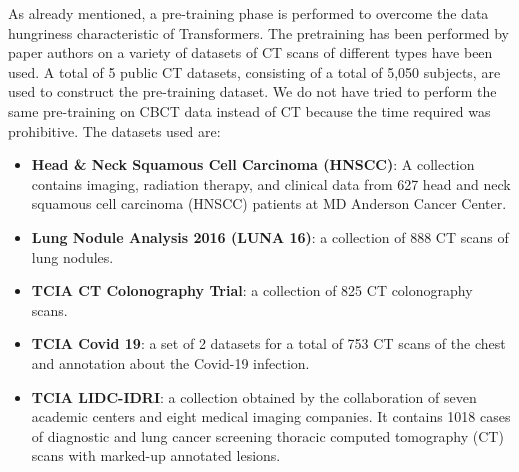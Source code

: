 As already mentioned, a pre-training phase is performed to overcome the data
hungriness characteristic of Transformers. The pretraining has been performed by
paper authors on a variety of datasets of CT scans of different types have been
used. A total of 5 public CT datasets, consisting of a total of 5,050 subjects,
are used to construct the pre-training dataset. We do not have tried to perform
the same pre-training on CBCT data instead of CT because the time required was
prohibitive.
The datasets used are:
\begin{itemize}
  \item{\textbf{Head \& Neck Squamous Cell Carcinoma (HNSCC)}: A collection
    contains imaging, radiation therapy, and clinical data from 627 head and
    neck squamous cell carcinoma (HNSCC) patients at MD Anderson Cancer Center.}
  \item{\textbf{Lung Nodule Analysis 2016 (LUNA 16)}: a collection of 888 CT
    scans of lung nodules.}
  \item{\textbf{TCIA CT Colonography Trial}: a collection of 825 CT colonography
    scans.}
  \item{\textbf{TCIA Covid 19}: a set of 2 datasets for a total of 753 CT scans
    of the chest and annotation about the Covid-19 infection.}
  \item{\textbf{TCIA LIDC-IDRI}: a collection obtained by the collaboration of
    seven academic centers and eight medical imaging companies. It contains 1018
    cases of diagnostic and lung cancer screening thoracic computed tomography
    (CT) scans with marked-up annotated lesions.}
\end{itemize}

